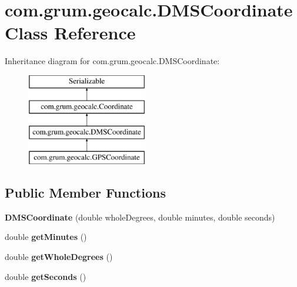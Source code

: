 \hypertarget{classcom_1_1grum_1_1geocalc_1_1_d_m_s_coordinate}{}\section{com.\+grum.\+geocalc.\+D\+M\+S\+Coordinate Class Reference}
\label{classcom_1_1grum_1_1geocalc_1_1_d_m_s_coordinate}
Inheritance diagram for com.\+grum.\+geocalc.\+D\+M\+S\+Coordinate\+:\begin{figure}[H]
\begin{center}
\leavevmode
\includegraphics[height=4.000000cm]{classcom_1_1grum_1_1geocalc_1_1_d_m_s_coordinate}
\end{center}
\end{figure}
\subsection*{Public Member Functions}
\begin{DoxyCompactItemize}
\item 
\mbox{\label{classcom_1_1grum_1_1geocalc_1_1_d_m_s_coordinate_a8dc280ca205a78f4d15067b20303fb43}} 
{\bfseries D\+M\+S\+Coordinate} (double whole\+Degrees, double minutes, double seconds)
\item 
\mbox{\label{classcom_1_1grum_1_1geocalc_1_1_d_m_s_coordinate_a3a0487cf7951c961e25ee14767e42d51}} 
double {\bfseries get\+Minutes} ()
\item 
\mbox{\label{classcom_1_1grum_1_1geocalc_1_1_d_m_s_coordinate_aeac7b297e98fa0684e1f998491e01ed2}} 
double {\bfseries get\+Whole\+Degrees} ()
\item 
\mbox{\label{classcom_1_1grum_1_1geocalc_1_1_d_m_s_coordinate_af695ef617a2e37410790f4d8af672544}} 
double {\bfseries get\+Seconds} ()
\end{DoxyCompactItemize}


